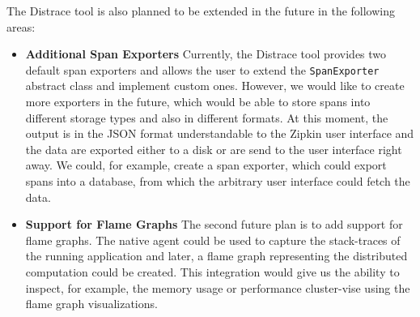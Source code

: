 The Distrace tool is also planned to be extended in the future in the following areas:
\begin{itemize}
	\item \textbf{Additional Span Exporters} \newline
	Currently, the Distrace tool provides two default span exporters and allows the user to extend the \texttt{SpanExporter} abstract class and implement custom ones. However, we would like to create more exporters in the future, which would be able to store spans into different storage types and also in different formats. At this moment, the output is in the JSON format understandable to the Zipkin user interface and the data are exported either to a disk or are send to the user interface right away. We could, for example, create a span exporter, which could export spans into a database, from which the arbitrary user interface could fetch the data.
	\item \textbf{Support for Flame Graphs} \newline
	The second future plan is to add support for flame graphs. The native agent could be used to capture the stack-traces of the running application and later, a flame graph representing the distributed computation could be created. This integration would give us the ability to inspect, for example, the memory usage or performance cluster-vise using the flame graph visualizations.
\end{itemize}

